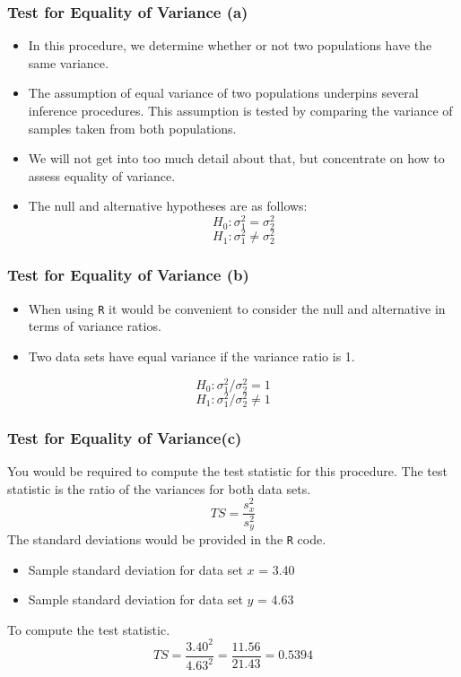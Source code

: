 \documentclass[a4]{beamer}
\begin{document}

\begin{frame}

\frametitle{Test for Equality of Variance (a)}
\begin{itemize}
\item In this procedure, we determine whether or not two populations have the same variance.
\item The assumption of equal variance of two populations underpins several inference procedures. This assumption is tested by comparing the variance of samples taken from both populations.
\item We will not get into too much detail about that, but concentrate on how to assess equality of variance.
\item The null and alternative hypotheses are as follows:
\[ H_0: \sigma^2_1 = \sigma^2_2 \]
\[ H_1: \sigma^2_1 \neq \sigma^2_2 \]
\end{itemize}

\end{frame}
\begin{frame}
\frametitle{Test for Equality of Variance (b)}
\begin{itemize}
\item When using \texttt{R} it would be convenient to consider the null and alternative in terms of variance ratios.
\item Two data sets have equal variance if the variance ratio is 1.
\end{itemize}

\[ H_0: \sigma^2_1 / \sigma^2_2 = 1 \]
\[ H_1: \sigma^2_1 / \sigma^2_2 \neq 1 \]
\end{frame}
\begin{frame}[fragile]
\frametitle{Test for Equality of Variance(c)}
You would be required to compute the test statistic for this procedure.
The test statistic is the ratio of the variances for both data sets.
\[ TS = \frac{s^2_x}{s^2_y} \]
The standard deviations would be provided in the \texttt{R} code. \begin{itemize}
\item Sample standard deviation for data set $x$ = 3.40
\item Sample standard deviation for data set $y$ = 4.63
\end{itemize}
To compute the test statistic.
\[ TS = \frac{3.40^2}{4.63^2} = \frac{11.56}{21.43} = 0.5394 \]

\end{frame}
\end{document}
